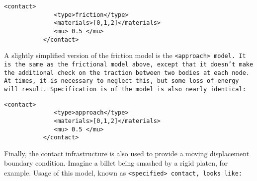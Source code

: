 \begin{Verbatim}[fontsize=\footnotesize]
           <contact>
              <type>friction</type>
              <materials>[0,1,2]</materials>
              <mu> 0.5 </mu>
           </contact>
\end{Verbatim}

A slightly simplified version of the friction model is the
\tt <approach> \normalfont model.  It is the same as the frictional model
above, except that it doesn't make the additional check on the traction
between two bodies at each node.  At times, it is necessary to neglect this,
but some loss of energy will result.  Specification is of the model is 
also nearly identical:

\begin{Verbatim}[fontsize=\footnotesize]
           <contact>
              <type>approach</type>
              <materials>[0,1,2]</materials>
              <mu> 0.5 </mu>
           </contact>
\end{Verbatim}

Finally, the contact infrastructure is also used to provide a moving
displacement boundary condition.  Imagine a billet being smashed by a
rigid platen, for example.  Usage of this model, known as
\tt <specified> \normalfont contact, looks like:

